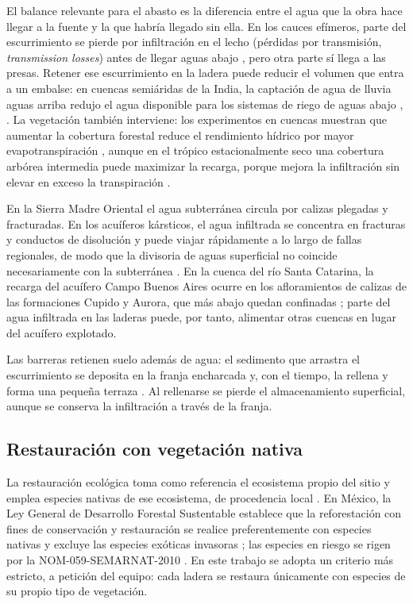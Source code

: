 El balance relevante para el abasto es la diferencia entre el agua que la obra hace llegar a la fuente y la que habría llegado sin ella. En los cauces efímeros, parte del escurrimiento se pierde por infiltración en el lecho (pérdidas por transmisión, \emph{transmission losses}) antes de llegar aguas abajo , pero otra parte sí llega a las presas. Retener ese escurrimiento en la ladera puede reducir el volumen que entra a un embalse: en cuencas semiáridas de la India, la captación de agua de lluvia aguas arriba redujo el agua disponible para los sistemas de riego de aguas abajo , . La vegetación también interviene: los experimentos en cuencas muestran que aumentar la cobertura forestal reduce el rendimiento hídrico por mayor evapotranspiración , aunque en el trópico estacionalmente seco una cobertura arbórea intermedia puede maximizar la recarga, porque mejora la infiltración sin elevar en exceso la transpiración .

En la Sierra Madre Oriental el agua subterránea circula por calizas plegadas y fracturadas. En los acuíferos kársticos, el agua infiltrada se concentra en fracturas y conductos de disolución y puede viajar rápidamente a lo largo de fallas regionales, de modo que la divisoria de aguas superficial no coincide necesariamente con la subterránea . En la cuenca del río Santa Catarina, la recarga del acuífero Campo Buenos Aires ocurre en los afloramientos de calizas de las formaciones Cupido y Aurora, que más abajo quedan confinadas ; parte del agua infiltrada en las laderas puede, por tanto, alimentar otras cuencas en lugar del acuífero explotado.

Las barreras retienen suelo además de agua: el sedimento que arrastra el escurrimiento se deposita en la franja encharcada y, con el tiempo, la rellena y forma una pequeña terraza . Al rellenarse se pierde el almacenamiento superficial, aunque se conserva la infiltración a través de la franja.

\subsection{Restauración con vegetación nativa}

La restauración ecológica toma como referencia el ecosistema propio del sitio y emplea especies nativas de ese ecosistema, de procedencia local . En México, la Ley General de Desarrollo Forestal Sustentable establece que la reforestación con fines de conservación y restauración se realice preferentemente con especies nativas y excluye las especies exóticas invasoras ; las especies en riesgo se rigen por la NOM-059-SEMARNAT-2010 . En este trabajo se adopta un criterio más estricto, a petición del equipo: cada ladera se restaura únicamente con especies de su propio tipo de vegetación.


